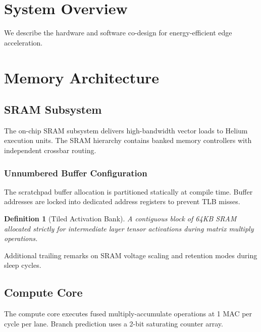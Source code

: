 \documentclass{article}
\newtheorem{definition}{Definition}
\begin{document}
\section{System Overview}
\label{sec:system_overview}
We describe the hardware and software co-design for energy-efficient edge acceleration.

\section{Memory Architecture}
\label{sec:memory_arch}

\subsection{SRAM Subsystem}
\label{subsec:sram_subsystem}
The on-chip SRAM subsystem delivers high-bandwidth vector loads to Helium execution units.
The SRAM hierarchy contains banked memory controllers with independent crossbar routing.

\subsubsection*{Unnumbered Buffer Configuration}
The scratchpad buffer allocation is partitioned statically at compile time.
Buffer addresses are locked into dedicated address registers to prevent TLB misses.

\begin{definition}[Tiled Activation Bank]
A contiguous block of 64KB SRAM allocated strictly for intermediate layer tensor activations during matrix multiply operations.
\end{definition}

Additional trailing remarks on SRAM voltage scaling and retention modes during sleep cycles.

\subsection{Compute Core}
\label{subsec:compute_core}
The compute core executes fused multiply-accumulate operations at 1 MAC per cycle per lane.
Branch prediction uses a 2-bit saturating counter array.
\end{document}
